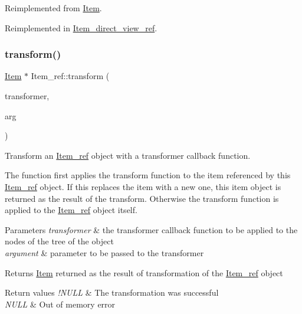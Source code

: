 Reimplemented from \mbox{\hyperlink{classItem_a7d1b934e9612e1c78bd369b31e3d9cb1}{Item}}.



Reimplemented in \mbox{\hyperlink{classItem__direct__view__ref_a29104c4d5e1f37059a1b0e357bb0cfc9}{Item\+\_\+direct\+\_\+view\+\_\+ref}}.

\mbox{\label{classItem__ref_a7918159b3087d8f56a9188e6469f1fd3}} 
\subsubsection{\texorpdfstring{transform()}{transform()}}
{\footnotesize\ttfamily \mbox{\hyperlink{classItem}{Item}} $\ast$ Item\+\_\+ref\+::transform (\begin{DoxyParamCaption}\item[{Item\+\_\+transformer}]{transformer,  }\item[{uchar $\ast$}]{arg }\end{DoxyParamCaption})\hspace{0.3cm}{\ttfamily [virtual]}}

Transform an \mbox{\hyperlink{classItem__ref}{Item\+\_\+ref}} object with a transformer callback function.

The function first applies the transform function to the item referenced by this \mbox{\hyperlink{classItem__ref}{Item\+\_\+ref}} object. If this replaces the item with a new one, this item object is returned as the result of the transform. Otherwise the transform function is applied to the \mbox{\hyperlink{classItem__ref}{Item\+\_\+ref}} object itself.


\begin{DoxyParams}{Parameters}
{\em transformer} & the transformer callback function to be applied to the nodes of the tree of the object \\
\hline
{\em argument} & parameter to be passed to the transformer\\
\hline
\end{DoxyParams}
\begin{DoxyReturn}{Returns}
\mbox{\hyperlink{classItem}{Item}} returned as the result of transformation of the \mbox{\hyperlink{classItem__ref}{Item\+\_\+ref}} object 
\end{DoxyReturn}

\begin{DoxyRetVals}{Return values}
{\em !\+N\+U\+LL} & The transformation was successful \\
\hline
{\em N\+U\+LL} & Out of memory error \\
\hline
\end{DoxyRetVals}


